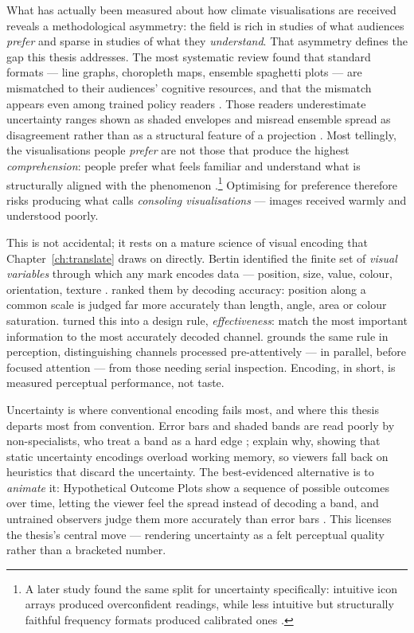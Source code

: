 What has actually been measured about how climate visualisations are received reveals a methodological asymmetry: the field is rich in studies of what audiences \emph{prefer} and sparse in studies of what they \emph{understand}. That asymmetry defines the gap this thesis addresses. The most systematic review found that standard formats --- line graphs, choropleth maps, ensemble spaghetti plots --- are mismatched to their audiences' cognitive resources, and that the mismatch appears even among trained policy readers \citep{harold2016}. Those readers underestimate uncertainty ranges shown as shaded envelopes and misread ensemble spread as disagreement rather than as a structural feature of a projection \citep{mcmahon2015}. Most tellingly, the visualisations people \emph{prefer} are not those that produce the highest \emph{comprehension}: people prefer what feels familiar and understand what is structurally aligned with the phenomenon \citep{kause2020}.\footnote{A later study found the same split for uncertainty specifically: intuitive icon arrays produced overconfident readings, while less intuitive but structurally faithful frequency formats produced calibrated ones \citep{kause2021}.} Optimising for preference therefore risks producing what \citet{sheppard2015} calls \emph{consoling visualisations} --- images received warmly and understood poorly.

This is not accidental; it rests on a mature science of visual encoding that Chapter~\ref{ch:translate} draws on directly. Bertin identified the finite set of \emph{visual variables} through which any mark encodes data --- position, size, value, colour, orientation, texture \citep{bertin1983}. \citet{clevelandmcgill1984} ranked them by decoding accuracy: position along a common scale is judged far more accurately than length, angle, area or colour saturation. \citet{munzner2014} turned this into a design rule, \emph{effectiveness}: match the most important information to the most accurately decoded channel. \citet{ware2021} grounds the same rule in perception, distinguishing channels processed pre-attentively --- in parallel, before focused attention --- from those needing serial inspection. Encoding, in short, is measured perceptual performance, not taste.



Uncertainty is where conventional encoding fails most, and where this thesis departs most from convention. Error bars and shaded bands are read poorly by non-specialists, who treat a band as a hard edge \citep{spiegelhalter2017}; \citet{padilla2018} explain why, showing that static uncertainty encodings overload working memory, so viewers fall back on heuristics that discard the uncertainty. The best-evidenced alternative is to \emph{animate} it: Hypothetical Outcome Plots show a sequence of possible outcomes over time, letting the viewer feel the spread instead of decoding a band, and untrained observers judge them more accurately than error bars \citep{hullman2015hops, kale2019hops}. This licenses the thesis's central move --- rendering uncertainty as a felt perceptual quality rather than a bracketed number.

